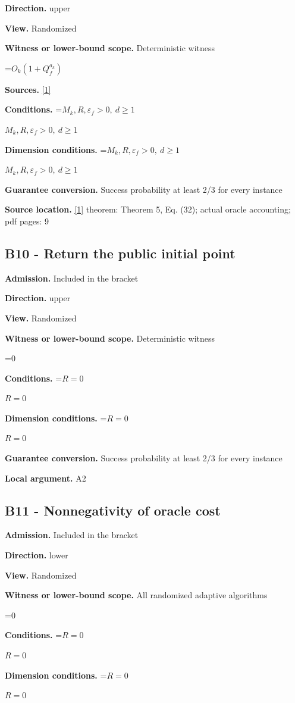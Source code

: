 \documentclass[10pt,a4paper]{article}
\newcommand{\AtlasMath}[1]{\par\begingroup\centering\setbox0=\hbox{$\displaystyle #1$}\ifdim\wd0>1.4\linewidth\typeout{ATLAS WIDE FORMULA: \the\wd0}\fi\ifdim\wd0>\linewidth\resizebox{\linewidth}{!}{\box0}\else\box0\fi\par\endgroup}
\newcommand{\AtlasInlineMath}[1]{\begingroup\setbox0=\hbox{$#1$}\ifdim\wd0>.4\linewidth\endgroup\AtlasMath{#1}\else\endgroup$#1$\fi}
\begin{document}
\textbf{Direction.} upper

\textbf{View.} Randomized

\textbf{Witness or lower-bound scope.} Deterministic witness

\AtlasMath{O_k(1+Q_f^{a_k})}
\textbf{Sources.} \href{https://arxiv.org/pdf/2205.09647v1}{[1]}

\textbf{Conditions.} \AtlasInlineMath{M_k,R,\varepsilon_f>0,\ d\ge1}

\textbf{Dimension conditions.} \AtlasInlineMath{M_k,R,\varepsilon_f>0,\ d\ge1}

\textbf{Guarantee conversion.} Success probability at least 2/3 for every instance

\textbf{Source location.} \href{https://arxiv.org/pdf/2205.09647v1}{[1]} theorem: Theorem 5, Eq. (32); actual oracle accounting; pdf pages: 9

\subsection{B10 - Return the public initial point}
\textbf{Admission.} Included in the bracket

\textbf{Direction.} upper

\textbf{View.} Randomized

\textbf{Witness or lower-bound scope.} Deterministic witness

\AtlasMath{0}
\textbf{Conditions.} \AtlasInlineMath{R=0}

\textbf{Dimension conditions.} \AtlasInlineMath{R=0}

\textbf{Guarantee conversion.} Success probability at least 2/3 for every instance

\textbf{Local argument.} A2

\subsection{B11 - Nonnegativity of oracle cost}
\textbf{Admission.} Included in the bracket

\textbf{Direction.} lower

\textbf{View.} Randomized

\textbf{Witness or lower-bound scope.} All randomized adaptive algorithms

\AtlasMath{0}
\textbf{Conditions.} \AtlasInlineMath{R=0}

\textbf{Dimension conditions.} \AtlasInlineMath{R=0}
\end{document}
